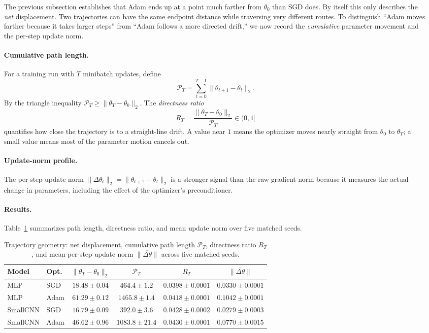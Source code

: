 \documentclass[11pt]{article}
\begin{document}
The previous subsection establishes that Adam ends up at a point much farther from $\theta_0$ than SGD does. By itself this only describes the \emph{net} displacement. Two trajectories can have the same endpoint distance while traversing very different routes. To distinguish ``Adam moves farther because it takes larger steps'' from ``Adam follows a more directed drift,'' we now record the \emph{cumulative} parameter movement and the per-step update norm.

\paragraph{Cumulative path length.} For a training run with $T$ minibatch updates, define
\[
\mathcal{P}_T
= \sum_{t=0}^{T-1}\|\theta_{t+1}-\theta_t\|_2.
\]
By the triangle inequality $\mathcal{P}_T \ge \|\theta_T-\theta_0\|_2$. The \emph{directness ratio}
\[
R_T = \frac{\|\theta_T-\theta_0\|_2}{\mathcal{P}_T}\in (0,1]
\]
quantifies how close the trajectory is to a straight-line drift. A value near $1$ means the optimizer moves nearly straight from $\theta_0$ to $\theta_T$; a small value means most of the parameter motion cancels out.

\paragraph{Update-norm profile.} The per-step update norm $\|\Delta\theta_t\|_2 = \|\theta_{t+1}-\theta_t\|_2$ is a stronger signal than the raw gradient norm because it measures the actual change in parameters, including the effect of the optimizer's preconditioner.

\paragraph{Results.} Table~\ref{tab:path-length} summarizes path length, directness ratio, and mean update norm over five matched seeds.

\begin{table}[H]
\centering
\small
\setlength{\tabcolsep}{4pt}
\begin{tabular}{llcccc}
\toprule
\textbf{Model} & \textbf{Opt.} & $\|\theta_T-\theta_0\|_2$ & $\mathcal{P}_T$ & $R_T$ & $\overline{\|\Delta\theta\|}$ \\
\midrule
MLP      & SGD  & $18.48 \pm 0.04$  & $464.4 \pm 1.2$    & $0.0398 \pm 0.0001$ & $0.0330 \pm 0.0001$ \\
MLP      & Adam & $61.29 \pm 0.12$  & $1465.8 \pm 1.4$   & $0.0418 \pm 0.0001$ & $0.1042 \pm 0.0001$ \\
SmallCNN & SGD  & $16.79 \pm 0.09$  & $392.0 \pm 3.6$    & $0.0428 \pm 0.0002$ & $0.0279 \pm 0.0003$ \\
SmallCNN & Adam & $46.62 \pm 0.96$  & $1083.8 \pm 21.4$  & $0.0430 \pm 0.0001$ & $0.0770 \pm 0.0015$ \\
\bottomrule
\end{tabular}
\caption{Trajectory geometry: net displacement, cumulative path length $\mathcal{P}_T$, directness ratio $R_T$, and mean per-step update norm $\overline{\|\Delta\theta\|}$ across five matched seeds.}
\label{tab:path-length}
\end{table}
\end{document}
